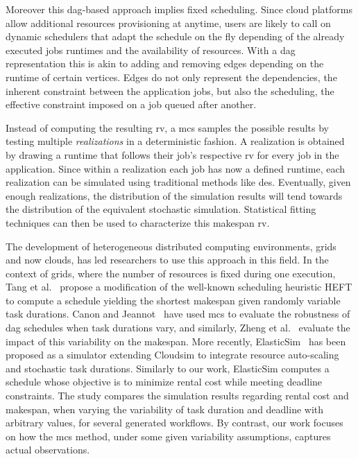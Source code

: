 \documentclass[10pt,conference,compsocconf]{IEEEtran}
\begin{document}
Moreover this \ac{dag}-based approach implies fixed scheduling. 
Since cloud platforms allow additional resources provisioning at anytime,
users are likely to call on dynamic schedulers that adapt the schedule on the fly
depending of the already executed jobs runtimes and the availability of
resources. With a \ac{dag} representation this is akin to adding
and removing edges depending on the runtime of certain vertices. Edges do not
only represent the dependencies, the inherent constraint between the application
jobs, but also the scheduling, the effective constraint imposed on a job queued
after another.


Instead  of computing  the resulting  \ac{rv}, a  \ac{mcs} samples  the possible
results by testing  multiple \emph{realizations} in a  deterministic fashion.  A
realization is obtained by drawing a runtime that follows their job's respective 
\ac{rv} for  every job in the  application. Since within a realization each job
has now a  defined runtime, each realization can be  simulated using traditional
methods like \ac{des}.  Eventually, given enough realizations, the distribution of
the simulation  results will  tend towards the  distribution of  the equivalent
stochastic  simulation.  Statistical  fitting  techniques can  then  be used  to
characterize this makespan \ac{rv}.

The development  of heterogeneous distributed computing  environments, grids and
now clouds,  has led  researchers to use  this approach in  this field.   In the
context of grids,  where the number of resources is  fixed during one execution,
Tang et  al.~\cite{Tang11} propose a  modification of the  well-known scheduling
heuristic  HEFT to  compute  a  schedule yielding  the  shortest makespan  given
randomly  variable task  durations. Canon and Jeannot~\cite{Canon10} have used  \ac{mcs} to
evaluate  the robustness  of \ac{dag}  schedules when  task durations  vary, and
similarly, Zheng et  al.~\cite{Zheng13} evaluate the impact  of this variability
on the makespan. More  recently, ElasticSim~\cite{Cai17} has been  proposed as a
simulator extending  Cloudsim to integrate resource  auto-scaling and stochastic
task  durations. Similarly  to our  work, ElasticSim  computes a  schedule whose
objective  is  to  minimize  rental  cost while meeting deadline
constraints.  The  study compares the  simulation results regarding  rental cost
and makespan,  when varying the variability  of task duration and  deadline with
arbitrary  values,  for  several  generated workflows.  By  contrast,  our  work
focuses on how the \ac{mcs} method, under some given variability assumptions, 
captures actual observations.
\end{document}
